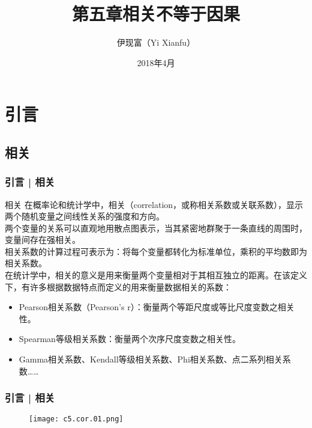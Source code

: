 



\title[相关 vs. 因果]{第五章\quad 相关不等于因果}
\author[Yixf]{伊现富（Yi Xianfu）}
\date{2018年4月}



\section{引言}
\subsection{相关}
\begin{frame}
  \frametitle{引言 | 相关}
  \begin{block}{相关}
在概率论和统计学中，相关（correlation，或称相关系数或关联系数），显示两个随机变量之间线性关系的强度和方向。\\
\vspace{0.5em}
两个变量的关系可以直观地用散点图表示，当其紧密地群聚于一条直线的周围时，变量间存在强相关。\\
\vspace{0.5em}
相关系数的计算过程可表示为：将每个变量都转化为标准单位，乘积的平均数即为相关系数。\\
\vspace{0.5em}
在统计学中，相关的意义是用来衡量两个变量相对于其相互独立的距离。在该定义下，有许多根据数据特点而定义的用来衡量数据相关的系数：
\begin{itemize}
  \item Pearson相关系数（Pearson's r）：衡量两个等距尺度或等比尺度变数之相关性。
  \item Spearman等级相关系数：衡量两个次序尺度变数之相关性。
  \item Gamma相关系数、Kendall等级相关系数、Phi相关系数、点二系列相关系数……
\end{itemize}
  \end{block}
\end{frame}

\begin{frame}
  \frametitle{引言 | 相关}
  \begin{figure}
    \centering
    \texttt{[image: c5.cor.01.png]}
  \end{figure}
\end{frame}

